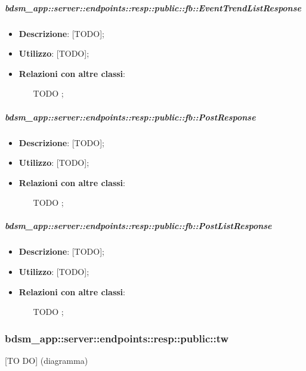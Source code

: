     \subparagraph{bdsm\_app::server::endpoints::resp::public::fb::EventTrendListResponse} %
    \label{subp:bdsm_app_server_endpoints_resp_public_fb_eventtrendlistresponse}
    \begin{itemize}
      \item \textbf{Descrizione}: [TODO];
      \item \textbf{Utilizzo}: [TODO];
      \item \textbf{Relazioni con altre classi}:
        \begin{itemize}
          \item [TODO];
        \end{itemize}
      \end{itemize}
    
    \subparagraph{bdsm\_app::server::endpoints::resp::public::fb::PostResponse} %
    \label{subp:bdsm_app_server_endpoints_resp_public_fb_postresponse}
    \begin{itemize}
      \item \textbf{Descrizione}: [TODO];
      \item \textbf{Utilizzo}: [TODO];
      \item \textbf{Relazioni con altre classi}:
        \begin{itemize}
          \item [TODO];
        \end{itemize}
      \end{itemize}
    
    \subparagraph{bdsm\_app::server::endpoints::resp::public::fb::PostListResponse} %
    \label{subp:bdsm_app_server_endpoints_resp_public_fb_postlistresponse}
    \begin{itemize}
      \item \textbf{Descrizione}: [TODO];
      \item \textbf{Utilizzo}: [TODO];
      \item \textbf{Relazioni con altre classi}:
        \begin{itemize}
          \item [TODO];
        \end{itemize}
      \end{itemize}

\subsubsection{bdsm\_app::server::endpoints::resp::public::tw} %
\label{ssub:bdsm_app_server_endpoints_resp_public_tw}
[TO DO] (diagramma) \newline \newline

